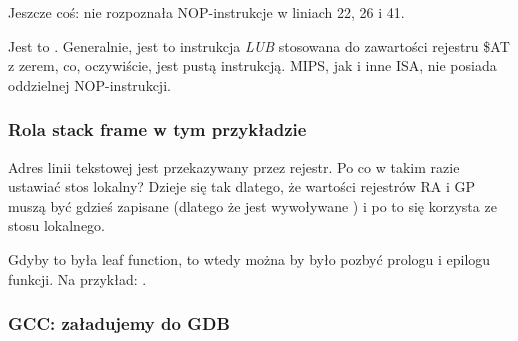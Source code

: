 Jeszcze coś: \IDA nie rozpoznała \ac{NOP}-instrukcje w liniach 22, 26 i 41.

Jest to .
Generalnie, jest to instrukcja \emph{LUB} stosowana do zawartości rejestru \$AT z zerem,
co, oczywiście, jest pustą instrukcją.
MIPS, jak i inne \ac{ISA}, nie posiada oddzielnej \ac{NOP}-instrukcji.

\subsubsection{Rola stack frame w tym przykładzie}

Adres linii tekstowej jest przekazywany przez rejestr.
Po co w takim razie ustawiać stos lokalny?
Dzieje się tak dlatego, że wartości rejestrów \ac{RA} i GP muszą być gdzieś zapisane
(dlatego że jest wywoływane \printf) i po to się korzysta ze stosu lokalnego.

Gdyby to była \gls{leaf function}, to wtedy można by było pozbyć prologu i epilogu funkcji. Na przykład:
 .

\subsubsection{\Optimizing GCC: załadujemy do GDB}




